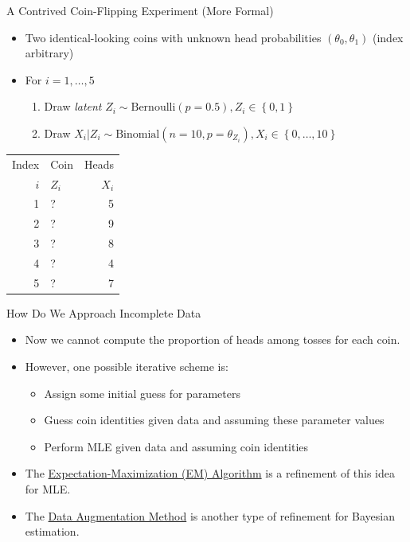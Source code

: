 \documentclass[dvipdfmx,bigger,aspectratio=169]{beamer}
\begin{document}
\begin{frame}[label={sec:orgb775f94}]{A Contrived Coin-Flipping Experiment (More Formal)}
\begin{itemize}
\item Two identical-looking coins with unknown head probabilities \((\theta_{0},\theta_{1})\) (index arbitrary)
\item For \(i = 1, \dots, 5\)
\begin{enumerate}
\item Draw \emph{latent} \(Z_{i} \sim \text{Bernoulli}(p = 0.5), Z_{i} \in \left\{ 0,1 \right\}\)
\item Draw \(X_{i} | Z_{i} \sim \text{Binomial}(n = 10, p = \theta_{Z_{i}}), X_{i} \in \left\{ 0, \dots, 10 \right\}\)
\end{enumerate}
\end{itemize}
\begin{center}
\begin{tabular}{rlr}
Index & Coin & Heads\\
\(i\) & \(Z_{i}\) & \(X_{i}\)\\
\hline
1 & ? & 5\\
2 & ? & 9\\
3 & ? & 8\\
4 & ? & 4\\
5 & ? & 7\\
\end{tabular}
\end{center}
\end{frame}

\begin{frame}[label={sec:orgfd6f4d0}]{How Do We Approach Incomplete Data}
\begin{itemize}
\item Now we cannot compute the proportion of heads among tosses for each coin.
\item However, one possible iterative scheme is:
\begin{itemize}
\item Assign some initial guess for parameters
\item Guess coin identities given data and assuming these parameter values
\item Perform MLE given data and assuming coin identities
\end{itemize}
\item The \hyperlink{sec:orgd2f2888}{Expectation-Maximization (EM) Algorithm} \cite{dempsterMaximumLikelihoodIncomplete1977} is a refinement of this idea for MLE.
\item The \hyperlink{sec:orgc38518e}{Data Augmentation Method} \cite{tannerCalculationPosteriorDistributions1987} is another type of refinement for Bayesian estimation.
\end{itemize}
\end{frame}
\end{document}
